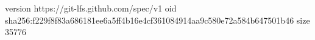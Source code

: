 version https://git-lfs.github.com/spec/v1
oid sha256:f229f8f83a686181ee6a5ff4b16e4cf361084914aa9c580e72a584b647501b46
size 35776
